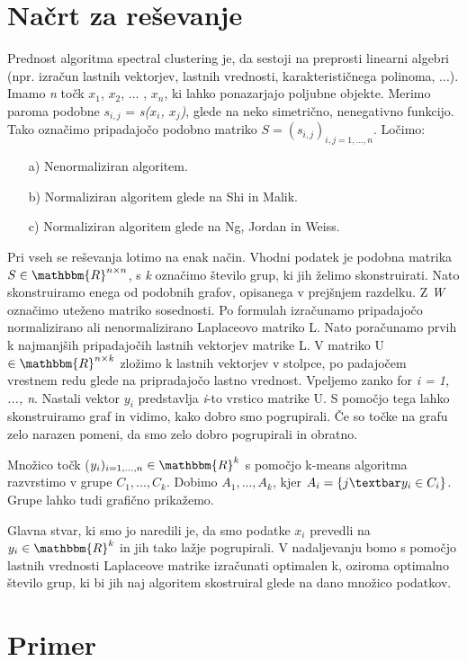 \documentclass[a4paper, 10pt]{article}
\begin{document}
\section{Načrt za reševanje}
Prednost algoritma spectral clustering je, da sestoji na preprosti linearni algebri (npr. izračun lastnih vektorjev, lastnih vrednosti, karakterističnega polinoma, ...). Imamo \textsl{n} točk $x_1$, $x_2$, ... , $x_n$, ki lahko ponazarjajo poljubne objekte. Merimo paroma podobne  \textsl{$s_{i,j}$} =  \textsl{s($x_i$, $x_j$)}, glede na neko simetrično, nenegativno funkcijo. Tako označimo pripadajočo podobno matriko $S=(s_{i,j})_{i,j = 1,..., n}$. Ločimo:
\begin{itemize}
\item[a)] Nenormaliziran algoritem.
\item[b)] Normaliziran algoritem glede na Shi in Malik.
\item[c)] Normaliziran algoritem glede na Ng, Jordan in Weiss.
\end{itemize}
Pri vseh se reševanja lotimo na enak način. Vhodni podatek je podobna matrika $S\in\mathbbm{ R}^{n\times n}$, s  \textsl{k} označimo število grup, ki jih želimo skonstruirati. Nato skonstruiramo enega od podobnih grafov, opisanega v prejšnjem razdelku. Z \textsl{W} označimo uteženo matriko sosednosti. Po formulah izračunamo pripadajočo normalizirano ali nenormalizirano Laplaceovo matriko L. Nato poračunamo prvih k najmanjših pripadajočih lastnih vektorjev matrike L. V matriko U $\in \mathbbm{R}^{n \times k}$ zložimo k lastnih vektorjev v stolpce, po padajočem vrestnem redu glede na pripradajočo lastno vrednost. Vpeljemo zanko for \textsl{i = 1, ..., n}. Nastali vektor $y_i$ predstavlja \textsl{i}-to vrstico matrike U. S pomočjo tega lahko skonstruiramo graf in vidimo, kako dobro smo pogrupirali. Če so točke na grafu zelo narazen pomeni, da smo zelo dobro pogrupirali in obratno.

Množico točk ($y_i)_{i = 1, ..., n}\in \mathbbm{R}^k$ s pomočjo k-means algoritma razvrstimo v grupe $C_1, ..., C_k$. Dobimo $A_1, ..., A_k$, kjer $A_i=\{j\textbar y_i\in C_i\}$. Grupe lahko tudi grafično prikažemo.

Glavna stvar, ki smo jo naredili je, da smo podatke $x_i$ prevedli na $y_i\in \mathbbm{R}^{k}$ in jih tako lažje pogrupirali. V nadaljevanju bomo s pomočjo lastnih vrednosti Laplaceove matrike izračunati optimalen k, oziroma optimalno število grup, ki bi jih naj algoritem skostruiral glede na dano množico podatkov.

\section{Primer}
\end{document}
